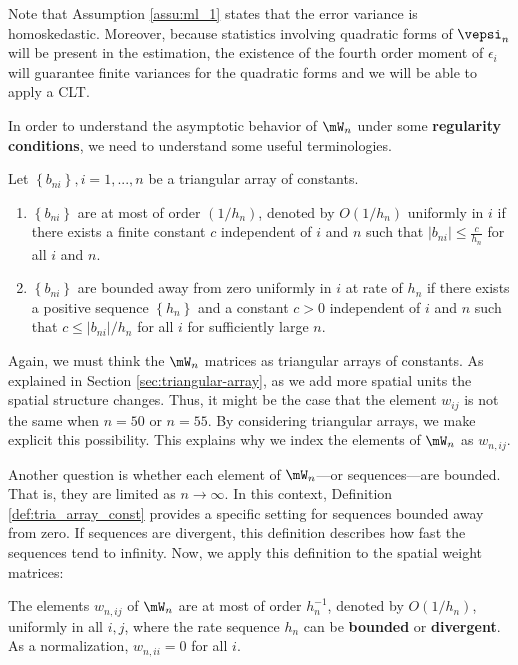 Note that Assumption \ref{assu:ml_1} states that the error variance is homoskedastic. Moreover, because statistics involving quadratic forms of $\vepsi_n$ will be present in the estimation, the existence of the fourth order moment of $\epsilon_{i}$ will guarantee finite variances for the quadratic forms and we will be able to apply a CLT. 

In order to understand the asymptotic behavior of $\mW_n$ under some \textbf{regularity conditions}, we need to understand some useful terminologies.

\begin{definition}\label{def:tria_array_const}
Let $\left\lbrace b_{ni} \right\rbrace, i = 1,...,n$ be a triangular array of constants.

\begin{enumerate}
  \item $\left\lbrace b_{ni} \right\rbrace$ are at most of order $(1/h_n)$, denoted by $O(1/h_n)$ uniformly in $i$ if there exists a finite constant $c$ independent of $i$ and $n$ such that $\left|b_{ni}\right|\leq \frac{c}{h_n}$ for all $i$ and $n$.
  \item $\left\lbrace b_{ni} \right\rbrace$ are bounded away from zero uniformly in $i$ at rate of $h_n$ if there exists a positive sequence $\left\lbrace h_{n} \right\rbrace$ and a constant $c>0$ independent of $i$ and $n$ such that $c\leq \left|b_{ni}\right|/ h_n$ for all $i$ for sufficiently large $n$.
\end{enumerate}
\end{definition}

Again, we must think the $\mW_n$ matrices as triangular arrays of constants. As explained in Section \ref{sec:triangular-array}, as we add more spatial units the spatial structure changes. Thus, it might be the case that the element $w_{ij}$ is not the same when $n = 50$ or $n = 55$. By considering triangular arrays, we make explicit this possibility. This explains why we index the elements of $\mW_n$ as $w_{n, ij}$.

Another question is whether each element of $\mW_n$---or sequences---are bounded. That is, they are limited as $n\to \infty$. In this context, Definition \ref{def:tria_array_const} provides a specific setting for sequences bounded away from zero. If sequences are divergent, this definition describes how fast the sequences tend to infinity. Now, we apply this definition to the spatial weight matrices:

\begin{assumption}\label{assu:ml_2}
	The elements $w_{n,ij}$ of $\mW_n$ are at most of order $h_n^{-1}$, denoted by $O(1/h_n)$, uniformly in all $i,j$, where the rate sequence ${h_n}$ can be \textbf{bounded} or \textbf{divergent}. As a normalization, $w_{n,ii} = 0$ for all $i$.
\end{assumption}

